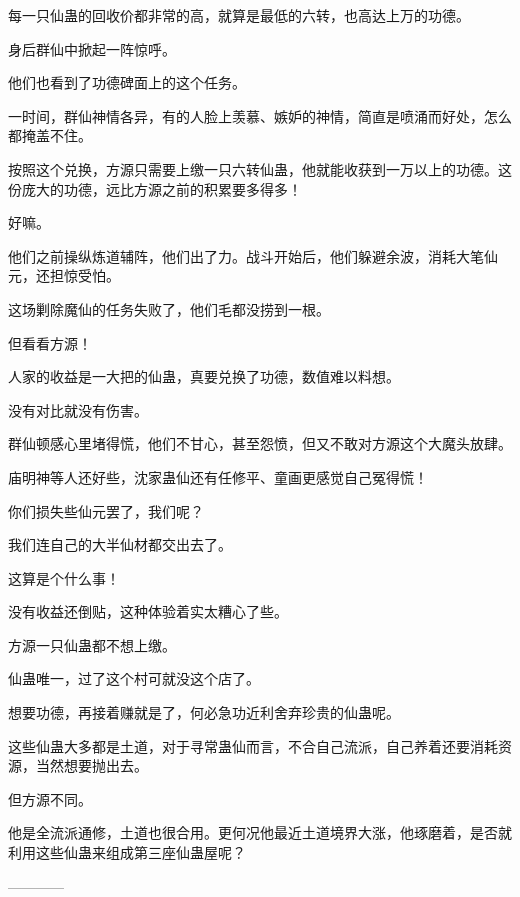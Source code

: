 \begin{this_body}
每一只仙蛊的回收价都非常的高，就算是最低的六转，也高达上万的功德。

身后群仙中掀起一阵惊呼。

他们也看到了功德碑面上的这个任务。

一时间，群仙神情各异，有的人脸上羡慕、嫉妒的神情，简直是喷涌而好处，怎么都掩盖不住。

按照这个兑换，方源只需要上缴一只六转仙蛊，他就能收获到一万以上的功德。这份庞大的功德，远比方源之前的积累要多得多！

好嘛。

他们之前操纵炼道辅阵，他们出了力。战斗开始后，他们躲避余波，消耗大笔仙元，还担惊受怕。

这场剿除魔仙的任务失败了，他们毛都没捞到一根。

但看看方源！

人家的收益是一大把的仙蛊，真要兑换了功德，数值难以料想。

没有对比就没有伤害。

群仙顿感心里堵得慌，他们不甘心，甚至怨愤，但又不敢对方源这个大魔头放肆。

庙明神等人还好些，沈家蛊仙还有任修平、童画更感觉自己冤得慌！

你们损失些仙元罢了，我们呢？

我们连自己的大半仙材都交出去了。

这算是个什么事！

没有收益还倒贴，这种体验着实太糟心了些。

方源一只仙蛊都不想上缴。

仙蛊唯一，过了这个村可就没这个店了。

想要功德，再接着赚就是了，何必急功近利舍弃珍贵的仙蛊呢。

这些仙蛊大多都是土道，对于寻常蛊仙而言，不合自己流派，自己养着还要消耗资源，当然想要抛出去。

但方源不同。

他是全流派通修，土道也很合用。更何况他最近土道境界大涨，他琢磨着，是否就利用这些仙蛊来组成第三座仙蛊屋呢？

------------

\end{this_body}

